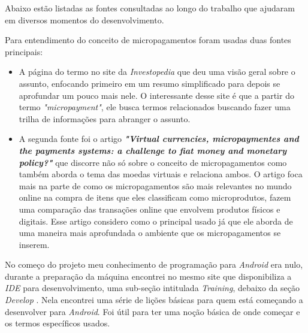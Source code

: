 \documentclass[hidelinks,12pt]{article}
\begin{document}
Abaixo est\~ao listadas as fontes consultadas ao longo do trabalho que ajudaram em diversos momentos do desenvolvimento.
\newline

Para entendimento do conceito de micropagamentos foram usadas duas fontes principais:
\begin{itemize}
\item A p\'agina do termo \cite{invest} no site da \textit{Investopedia} que deu uma vis\~ao geral sobre o assunto, enfocando primeiro em um resumo simplificado para depois se aprofundar um pouco mais nele. O interessante desse site \'e que a partir do termo \textit{"micropayment"}, ele busca termos relacionados buscando fazer uma trilha de informa\c{c}\~oes para abranger o assunto.
\item A segunda fonte foi o artigo \textbf{\textit{"Virtual currencies, micropaymentes and the payments systems: a challenge to fiat money and monetary policy?"}} \cite{microp} que discorre n\~ao s\'o sobre o conceito de micropagamentos como tamb\'em aborda o tema das moedas virtuais e relaciona ambos. O artigo foca mais na parte de como os micropagamentos s\~ao mais relevantes no mundo online na compra de itens que eles classificam como microprodutos, fazem uma compara\c{c}\~ao das transa\c{c}\~oes online que envolvem produtos f\'isicos e digitais. Esse artigo considero como o principal usado j\'a que ele aborda de uma maneira mais aprofundada o ambiente que os micropagamentos se inserem.
\end{itemize}

No come\c{c}o do projeto meu conhecimento de programa\c{c}\~ao para \textit{Android} era nulo, durante a prepara\c{c}\~ao da m\'aquina encontrei no mesmo site que disponibiliza a \textit{IDE} para desenvolvimento, uma sub-se\c{c}\~ao intitulada \textit{Training}, debaixo da se\c{c}\~ao \textit{Develop} \cite{anddev}. Nela encontrei uma s\'erie de li\c{c}\~oes b\'asicas para quem est\'a come\c{c}ando a desenvolver para \textit{Android}. Foi \'util para ter uma no\c{c}\~ao b\'asica de onde come\c{c}ar e os termos espec\'ificos usados.
\newline
\end{document}
